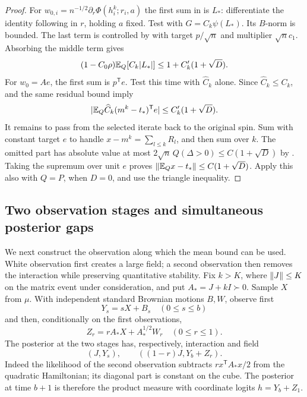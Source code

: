 \begin{proof}
For $w_{0,i}=n^{-1/2}\partial_r\Phi(h_i^k;r_i,a)$ the first sum in
 is $L_*$: differentiate the identity
following  in $r$, holding $a$ fixed.
Test with $G=C_k\psi(L_*)$.  Its $B$-norm is bounded.  The last term is
controlled by  with target $p/\sqrt n$ and
multiplier $\sqrt n c_1$.  Absorbing the middle term gives
\begin{equation}\label{eq:stat-L-first-moment}
 (1-C_0\rho)\mathbb E_Q[C_k|L_*|]\le1+C_k'(1+\sqrt D).
\end{equation}
For $w_0=Ae$, the first sum is $p^{\mathsf T}e$.  Test this time with
$\widehat C_k$ alone.  Since $\widehat C_k\le C_k$,
 and the same residual
bound imply
\[
 |\mathbb E_Q\widehat C_k(m^k-t_*)^{\mathsf T}e|
       \le C_k'(1+\sqrt D).
\]
It remains to pass from the selected iterate back to the original spin.
Sum  with constant target $e$ to handle
$x-m^k=\sum_{l\le k}R_l$, and then sum over $k$.  The omitted part has
absolute value at most
$2\sqrt n\,Q(\Delta>0)\le C(1+\sqrt D)$ by
.  Taking the supremum over unit $e$ proves
$\left\lVert \mathbb E_Qx-t_*\right\rVert\le C(1+\sqrt D)$.
Apply this also with $Q=P$, when $D=0$, and use the triangle inequality.
\end{proof}

\subsection{Two observation stages and simultaneous posterior gaps}

We next construct the observation along which the mean bound can be
used.  White observation first creates a large field; a second observation
then removes the interaction while preserving quantitative stability.
Fix $k>K$, where $\left\lVert J\right\rVert\le K$ on the matrix event under consideration,
and put $A_*=J+kI\succ0$.  Sample $X$ from $\mu$.  With independent
standard Brownian motions $B,W$, observe first
\[
 Y_s=sX+B_s\quad(0\le s\le b)
\]
and then, conditionally on the first observations,
\[
 Z_r=rA_*X+A_*^{1/2}W_r\quad(0\le r\le1).
\]
The posterior at the two stages has, respectively, interaction and field
\begin{equation}\label{eq:stat-posterior-parameters}
 (J,Y_s),\qquad ((1-r)J,Y_b+Z_r).
\end{equation}
Indeed the likelihood of the second observation subtracts
$r x^{\mathsf T}A_*x/2$ from the quadratic Hamiltonian; its diagonal part
is constant on the cube.  The posterior at time $b+1$ is therefore the
product measure with coordinate logits $h=Y_b+Z_1$.

